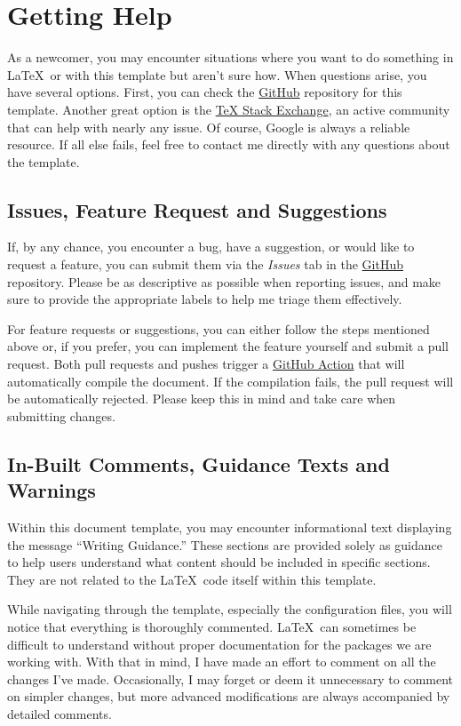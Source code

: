 \section{Getting Help}
As a newcomer, you may encounter situations where you want to do something in \LaTeX~or with this template but aren't sure how. When questions arise, you have several options. First, you can check the \href{https://github.com/mfrade/ULO-thesis/issues}{GitHub} repository for this template. Another great option is the \href{https://tex.stackexchange.com/}{TeX Stack Exchange}, an active community that can help with nearly any issue. Of course, Google is always a reliable resource. If all else fails, feel free to contact me directly with any questions about the template.

\subsection{Issues, Feature Request and Suggestions}
If, by any chance, you encounter a bug, have a suggestion, or would like to request a feature, you can submit them via the \textit{Issues} tab in the \href{https://github.com/mfrade/ULO-thesis}{GitHub} repository. Please be as descriptive as possible when reporting issues, and make sure to provide the appropriate labels to help me triage them effectively.

For feature requests or suggestions, you can either follow the steps mentioned above or, if you prefer, you can implement the feature yourself and submit a pull request. Both pull requests and pushes trigger a \href{https://github.com/mfrade/ULO-thesis/actions/workflows/latex.yml}{GitHub Action} that will automatically compile the document. If the compilation fails, the pull request will be automatically rejected. Please keep this in mind and take care when submitting changes.

\subsection{In-Built Comments, Guidance Texts and Warnings}
Within this document template, you may encounter informational text displaying the message ``Writing Guidance.'' These sections are provided solely as guidance to help users understand what content should be included in specific sections. They are not related to the \LaTeX~code itself within this template.

While navigating through the template, especially the configuration files, you will notice that everything is thoroughly commented. \LaTeX~can sometimes be difficult to understand without proper documentation for the packages we are working with. With that in mind, I have made an effort to comment on all the changes I’ve made. Occasionally, I may forget or deem it unnecessary to comment on simpler changes, but more advanced modifications are always accompanied by detailed comments.

